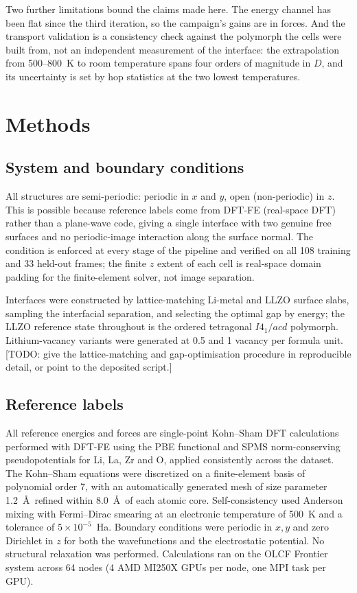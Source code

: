 \documentclass[11pt]{article}
\begin{document}
Two further limitations bound the claims made here. The energy channel has
been flat since the third iteration, so the campaign's gains are in forces.
And the transport validation is a consistency check against the polymorph
the cells were built from, not an independent measurement of the interface:
the extrapolation from 500--800~K to room temperature spans four orders of
magnitude in $D$, and its uncertainty is set by hop statistics at the two
lowest temperatures.

\section{Methods}

\subsection{System and boundary conditions}
All structures are semi-periodic: periodic in $x$ and $y$, open (non-periodic)
in $z$. This is possible because reference labels come from DFT-FE (real-space
DFT) rather than a plane-wave code, giving a single interface with two genuine
free surfaces and no periodic-image interaction along the surface
normal\citep{dftfe,Das2022}. The condition is enforced at every stage of the
pipeline and verified on all 108 training and 33 held-out frames; the finite
$z$ extent of each cell is real-space domain padding for the finite-element
solver, not image separation.

Interfaces were constructed by lattice-matching Li-metal and LLZO surface
slabs, sampling the interfacial separation, and selecting the optimal gap by
energy; the LLZO reference state throughout is the ordered tetragonal
$I4_1/acd$ polymorph\citep{Awaka2009}. Lithium-vacancy variants were
generated at 0.5 and 1 vacancy per formula unit. [TODO: give the
lattice-matching and gap-optimisation procedure in reproducible detail, or
point to the deposited script.]

\subsection{Reference labels}
All reference energies and forces are single-point Kohn--Sham DFT calculations
performed with DFT-FE\citep{dftfe,Das2022} using the PBE
functional\citep{pbe1996} and SPMS norm-conserving pseudopotentials\citep{spms}
for Li, La, Zr and O, applied consistently across the dataset. The Kohn--Sham
equations were discretized on a finite-element basis of polynomial order 7,
with an automatically generated mesh of size parameter 1.2~\AA\ refined within
8.0~\AA\ of each atomic core. Self-consistency used Anderson mixing with
Fermi--Dirac smearing at an electronic temperature of 500~K and a tolerance of
$5\times10^{-5}$~Ha. Boundary conditions were periodic in $x,y$ and zero
Dirichlet in $z$ for both the wavefunctions and the electrostatic potential. No
structural relaxation was performed. Calculations ran on the OLCF Frontier
system across 64 nodes (4 AMD MI250X GPUs per node, one MPI task per GPU).
\end{document}
